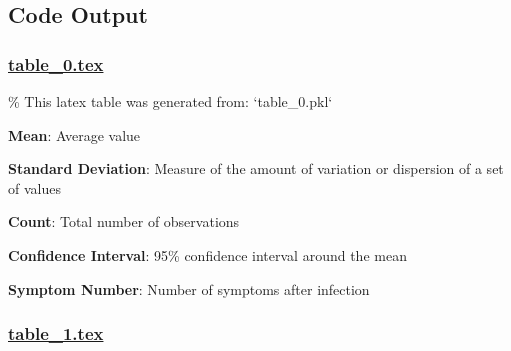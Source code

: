 \documentclass[11pt]{article}
\begin{document}
\subsection{Code Output}

\subsubsection*{\hyperlink{code-LaTeX Table Design-table-0-tex}{table\_0.tex}}

\begin{codeoutput}
\% This latex table was generated from: `table\_0.pkl`
\begin{table}[h]
\caption{Descriptive Statistics of the dataset}
\label{table:descriptive\_statistics}
\begin{threeparttable}
\renewcommand{\TPTminimum}{\linewidth}
\begin{tablenotes}
\footnotesize
\item \textbf{Mean}: Average value
\item \textbf{Standard Deviation}: Measure of the amount of variation or dispersion of a set of values
\item \textbf{Count}: Total number of observations
\item \textbf{Confidence Interval}: 95\% confidence interval around the mean
\item \textbf{Symptom Number}: Number of symptoms after infection
\end{tablenotes}
\end{threeparttable}
\end{table}
\end{codeoutput}

\subsubsection*{\hyperlink{code-LaTeX Table Design-table-1-tex}{table\_1.tex}}
\end{document}
